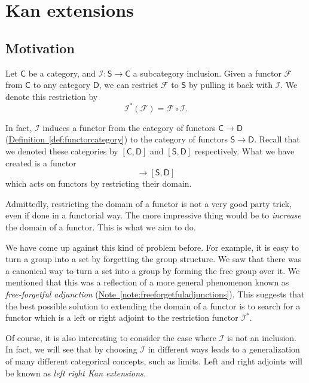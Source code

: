 \documentclass[notes.tex]{subfiles}
\begin{document}
\chapter{Kan extensions}
\label{sec:kan_extensions}

\section{Motivation}
\label{sec:motivation}

Let $\mathsf{C}$ be a category, and $\mathcal{I}\colon \mathsf{S} \to \mathsf{C}$ a subcategory inclusion. Given a functor $\mathcal{F}$ from $\mathsf{C}$ to any category $\mathsf{D}$, we can restrict $\mathcal{F}$ to $\mathsf{S}$ by pulling it back with $\mathcal{I}$. We denote this restriction by
\begin{equation*}
  \mathcal{I}^{*}(\mathcal{F}) = \mathcal{F} \circ \mathcal{I}.
\end{equation*}

In fact, $\mathcal{I}$ induces a functor from the category of functors $\mathsf{C} \to \mathsf{D}$ (\hyperref[def:functorcategory]{Definition~\ref*{def:functorcategory}}) to the category of functors $\mathsf{S} \to \mathsf{D}$. Recall that we denoted these categories by $[\mathsf{C}, \mathsf{D}]$ and $[\mathsf{S}, \mathsf{D}]$ respectively. What we have created is a functor
\begin{equation*}
  [\mathsf{C}, \mathsf{D}] \to [\mathsf{S}, \mathsf{D}]
\end{equation*}
which acts on functors by restricting their domain.

Admittedly, restricting the domain of a functor is not a very good party trick, even if done in a functorial way. The more impressive thing would be to \emph{increase} the domain of a functor. This is what we aim to do.

We have come up against this kind of problem before. For example, it is easy to turn a group into a set by forgetting the group structure. We saw that there was a canonical way to turn a set into a group by forming the free group over it. We mentioned that this was a reflection of a more general phenomenon known as \emph{free-forgetful adjunction} (\hyperref[note:freeforgetfuladjunctions]{Note~\ref*{note:freeforgetfuladjunctions}}). This suggests that the best possible solution to extending the domain of a functor is to search for a functor which is a left or right adjoint to the restriction functor $\mathcal{I}^{*}$.

Of course, it is also interesting to consider the case where $\mathcal{I}$ is not an inclusion. In fact, we will see that by choosing $\mathcal{I}$ in different ways leads to a generalization of many different categorical concepts, such as limits. Left and right adjoints will be known as \emph{left right Kan extensions.}
\end{document}
